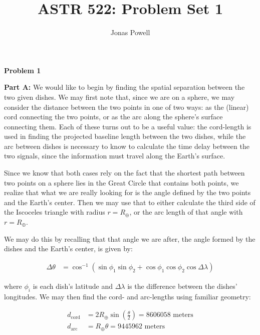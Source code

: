 \documentclass[12pt]{article}
\begin{document}
\title{\textbf{ASTR 522: Problem Set 1}}
\author{Jonas Powell}
\maketitle


\begin{onehalfspacing}




\raggedright{\textbf{\Large Problem 1}}\\
\raggedright{\textbf{\large Part A: }}
We would like to begin by finding the spatial separation between the two given dishes. We may first note that, since we are on a sphere, we may consider the distance between the two points in one of two ways: as the (linear) cord connecting the two points, or as the arc along the sphere's surface connecting them. Each of these turns out to be a useful value: the cord-length is used in finding the projected baseline length between the two dishes, while the arc between dishes is necessary to know to calculate the time delay between the two signals, since the information must travel along the Earth's surface. \bigskip

Since we know that both cases rely on the fact that the shortest path between two points on a sphere lies in the Great Circle that contains both points, we realize that what we are really looking for is the angle defined by the two points and the Earth's center. Then we may use that to either calculate the third side of the Iscoceles triangle with radius $r = R_{\oplus}$, or the arc length of that angle with $r = R_{\oplus}$. \bigskip

We may do this by recalling that that angle we are after, the angle formed by the dishes and the Earth's center, is given by:

\begin{align*}
  \Delta \theta &= \cos^{-1} \left( \sin{\phi_1} \sin{\phi_2} + \cos{\phi_1} \cos{\phi_2} \cos{\Delta \lambda} \right)
\end{align*}

where $\phi_i$ is each dish's latitude and $\Delta \lambda$ is the difference between the dishes' longitudes. We may then find the cord- and arc-lengths using familiar geometry:

\begin{align*}
  d_{\text{cord}} &= 2 R_{\oplus} \sin(\frac{\theta}{2}) = 8606058 \text{ meters}\\
  d_{\text{arc}} &= R_{\oplus} \theta = 9445962 \text{ meters}
\end{align*}
\bigskip


\end{onehalfspacing}
\end{document}
